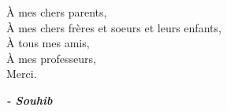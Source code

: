 
\begin{fquote}
\begin{center}
\large{

\uppercase{à} mes chers parents, \\[12pt]
\uppercase{à} mes chers frères et soeurs et leurs enfants,\\[12pt]
\uppercase{à} tous mes amis,\\[12pt]
\uppercase{à} mes professeurs,\\[12pt]
Merci.
}
\end{center}
\bigskip
\medskip
\end{fquote}

\begin{adjustwidth}{2cm}{1cm}
\hspace*{\fill} \textbf{\textit{\large{- Souhib}}}
\end{adjustwidth}

\clearpage
